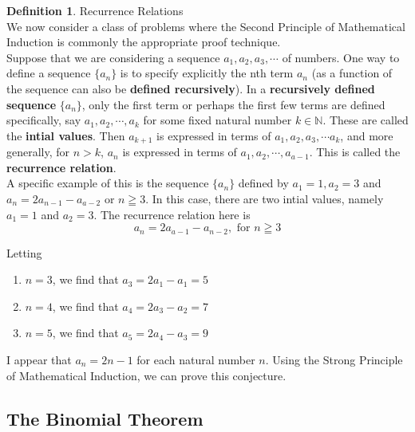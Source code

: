 \documentclass{book}
\theoremstyle{definition}
\newtheorem{definition}{Definition}[section]
\theoremstyle{remark}
\newcommand{\bb}[1]{\mathbb{#1}}
\begin{document}
\begin{definition}
Recurrence Relations \\


We now consider a class of problems where the Second Principle of Mathematical Induction is commonly the appropriate proof technique. \\

Suppose that we are considering a sequence $a_1, a_2, a_3, \cdots $ of numbers. One way to define a sequence $\{ a_n \}$ is to specify explicitly the nth term $a_n$ (as a function of the sequence can also be \textbf{defined recursively}). In a \textbf{recursively defined sequence} $\{ a_n \}$, only the first term or perhaps the first few terms are defined specifically, say $a_1, a_2, \cdots, a_k$ for some fixed natural number $k \in \bb{N}$. These are called the \textbf{intial values}. Then $a_{k+1}$ is expressed in terms of $a_1, a_2, a_3, \cdots a_k$, and more generally, for $n > k$, $a_n$ is expressed in terms of $a_1, a_2, \cdots, a_{a-1}$. This is called the \textbf{recurrence relation}. \\


A specific example of this is the sequence $\{ a_n \}$ defined by $a_1 = 1, a_2=3$ and $a_n = 2a_{n-1}- a_{a-2}$ or $n \geqq 3$. In this case, there are two intial values, namely $a_1 = 1$ and $a_2 = 3$. The recurrence relation here is 
    \begin{equation*}
        a_n = 2a_{a-1}-a_{n-2}, \text{ for } n \geqq 3 
    \end{equation*}

Letting 
    \begin{enumerate}
        \item $n=3$, we find that $a_3 = 2a_1 - a_1 = 5$
        \item $n=4$, we find that $a_4 = 2a_3 - a_2 = 7$
        \item $n=5$, we find that $a_5 = 2a_4 - a_3 = 9$
    \end{enumerate}
I appear that $a_n = 2n-1$ for each natural number $n$. Using the Strong Principle of Mathematical Induction, we can prove this conjecture.


\end{definition}



\newpage
\subsection{The Binomial Theorem}
\end{document}

